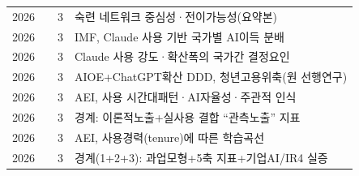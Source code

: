 \documentclass[11pt]{article}
\begin{document}
\begin{longtable}{L{0.9cm}L{4.6cm}L{0.9cm}L{6.2cm}}
2026 & \textcite{chang-2026-skill-network-ai-era} & 3 & 숙련 네트워크 중심성·전이가능성(요약본) \\
2026 & \textcite{fan-2026-aggregate-gains-from-ai} & 3 & IMF, Claude 사용 기반 국가별 AI이득 분배 \\
2026 & \textcite{fan-2026-what-countries-use-ai-and} & 3 & Claude 사용 강도·확산폭의 국가간 결정요인 \\
2026 & \textcite{han-2025-ai-diffusion-youth-employment-decline} & 3 & AIOE+ChatGPT확산 DDD, 청년고용위축(원 선행연구) \\
2026 & \textcite{massenkoff-2026-cadences} & 3 & AEI, 사용 시간대패턴·AI자율성·주관적 인식 \\
2026 & \textcite{massenkoff-2026-labor-market-impacts-of-ai} & 3 & 경계: 이론적노출+실사용 결합 ``관측노출'' 지표 \\
2026 & \textcite{massenkoff-2026-learning-curves} & 3 & AEI, 사용경력(tenure)에 따른 학습곡선 \\
2026 & \textcite{nam-2026-ai-macroeconomic-impact-analysis} & 3 & 경계(1+2+3): 과업모형+5축 지표+기업AI/IR4 실증 \\
\end{longtable}

\clearpage
\printbibliography[heading=bibintoc,title={참고문헌}]
\end{document}
